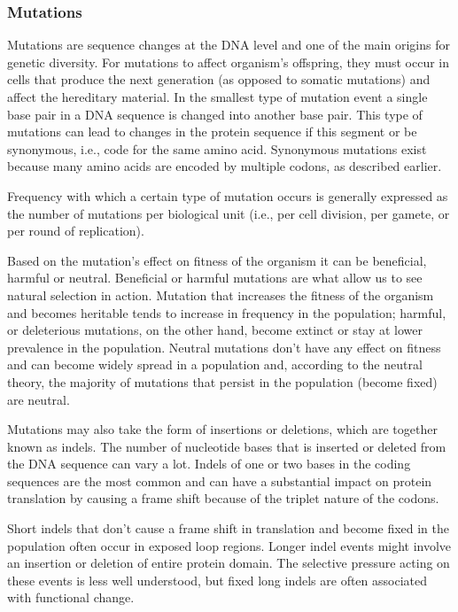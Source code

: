 \documentclass[11pt, a4paper,oneside]{report}
\begin{document}
\subsubsection{Mutations}
Mutations are sequence changes at the DNA level and one of the main origins for genetic diversity. For mutations to affect  organism's offspring, they must occur in cells that produce the next generation (as opposed to somatic mutations) and affect the hereditary material. In the smallest type of mutation event a single base pair in a DNA sequence is changed into another base pair. This type of mutations can lead to changes in the protein sequence if this segment or be synonymous, i.e., code for the same amino acid. Synonymous mutations exist because many amino acids are encoded by multiple codons, as described earlier.

Frequency with which a certain type of mutation occurs is generally expressed as the number of mutations per biological unit (i.e., per cell division, per gamete, or per round of replication).

Based on the mutation's effect on fitness of the organism it can be beneficial, harmful or neutral. Beneficial or harmful mutations are what allow us to see natural selection in action. Mutation that increases the fitness of the organism and becomes heritable tends to increase in frequency in the population; harmful, or deleterious mutations, on the other hand, become extinct or stay at lower prevalence in the population. Neutral mutations don't have any effect on fitness and can become widely spread in a population and, according to the neutral theory, the majority of mutations that persist in the population (become fixed) are neutral. 

Mutations may also take the form of insertions or deletions, which are together known as indels. The number of nucleotide bases that is inserted or deleted from the DNA sequence can vary a lot. Indels of one or two bases in the coding sequences are the most common and can have a substantial impact on protein translation by causing a frame shift because of the triplet nature of the codons.  

 Short indels that don't cause a frame shift in translation and become fixed in the population often occur in exposed loop regions\cite{Kim2010}. Longer indel events might involve an insertion or deletion of entire protein domain. The selective pressure acting on these events is less well understood, but fixed long indels are often associated with functional change\cite{Pascual-Garcia2010}.
\end{document}
